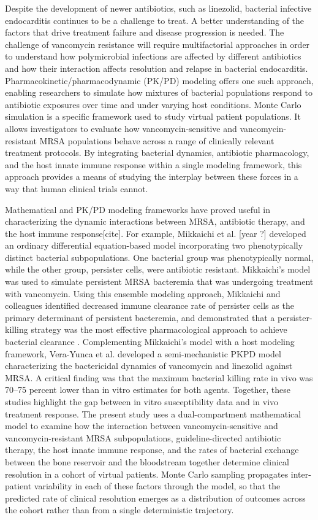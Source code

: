 \documentclass[12pt, draftcls, onecolumn]{IEEEtran}
\begin{document}
Despite the development of newer antibiotics, such as linezolid, bacterial infective endocarditis continues to be a challenge to treat. A better understanding of the factors that drive treatment failure and disease progression is needed. The challenge of vancomycin resistance will require  multifactorial approaches in order to understand how polymicrobial infections are affected by different antibiotics and how their interaction affects resolution and relapse in bacterial endocarditis.  Pharmacokinetic/pharmacodynamic (PK/PD) modeling offers one such approach, enabling researchers to simulate how mixtures of bacterial populations respond to antibiotic exposures over time and under varying host conditions. Monte Carlo simulation is a specific framework used to study virtual patient populations.  It allows investigators to evaluate how vancomycin-sensitive and vancomycin-resistant MRSA populations behave across a range of clinically relevant treatment protocols. By integrating bacterial dynamics, antibiotic pharmacology, and the host innate immune response within a single modeling framework, this approach provides a means of studying the interplay between these forces in a way that human clinical trials cannot.

Mathematical and PK/PD modeling frameworks have proved useful in characterizing the dynamic interactions between MRSA, antibiotic therapy, and the host immune response[cite]. For example, Mikkaichi et al. [year ?] developed an ordinary differential equation-based model incorporating two phenotypically distinct bacterial subpopulations.  One bacterial group was phenotypically normal, while the other group, persister cells, were antibiotic resistant.  Mikkaichi's model was used to simulate persistent MRSA bacteremia that was undergoing treatment with vancomycin.  Using this ensemble modeling approach, Mikkaichi and colleagues identified decreased immune clearance rate of persister cells as the primary determinant of persistent bacteremia, and demonstrated that a persister-killing strategy was the most effective pharmacological approach to achieve bacterial clearance \cite{Mikkaichi2019}. Complementing Mikkaichi's model with a host modeling framework, Vera-Yunca et al. developed a semi-mechanistic PKPD model characterizing the bactericidal dynamics of vancomycin and linezolid against MRSA. A critical finding was that the maximum bacterial killing rate in vivo was 70–75 percent lower than in vitro estimates for both agents\cite{VeraYunca2025}. Together, these studies highlight the gap between in vitro susceptibility data and in vivo treatment response.  The present study uses a dual-compartment mathematical model to examine how the interaction between vancomycin-sensitive and vancomycin-resistant MRSA subpopulations, guideline-directed antibiotic therapy, the host innate immune response, and the rates of bacterial exchange between the bone reservoir and the bloodstream together determine clinical resolution in a cohort of virtual patients. Monte Carlo sampling propagates inter-patient variability in each of these factors through the model, so that the predicted rate of clinical resolution emerges as a distribution of outcomes across the cohort rather than from a single deterministic trajectory.
\end{document}

